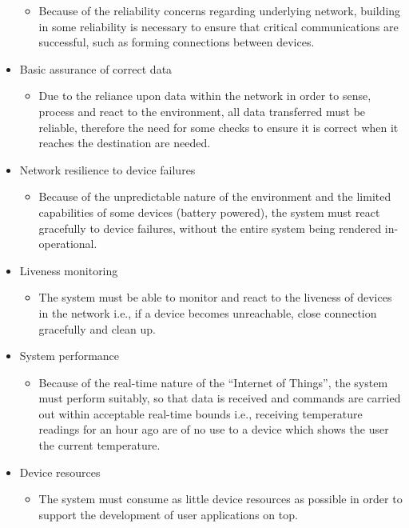 \begin{itemize}
	\begin{itemize}
		\item Because of the reliability concerns regarding underlying network, building in some reliability is necessary to ensure that critical communications are successful, such as forming connections between devices. 
	\end{itemize}
	\item Basic assurance of correct data
	\begin{itemize}
			\item Due to the reliance upon data within the network in order to sense, process and react to the environment, all data transferred must be reliable, therefore the need for some checks to ensure it is correct when it reaches the destination are needed. 
	\end{itemize}
	\item Network resilience to device failures
	\begin{itemize}
		\item Because of the unpredictable nature of the environment and the limited capabilities of some devices (battery powered), the system must react gracefully to device failures, without the entire system being rendered in-operational.
	\end{itemize}
	\item Liveness monitoring
	\begin{itemize}
		\item The system must be able to monitor and react to the liveness of devices in the network i.e., if a device becomes unreachable, close connection gracefully and clean up.
	\end{itemize}
	\item System performance
	\begin{itemize}
		\item Because of the real-time nature of the ``Internet of Things'', the system must perform suitably, so that data is received and commands are carried out within acceptable real-time bounds i.e., receiving temperature readings for an hour ago are of no use to a device which shows the user the current temperature.
	\end{itemize}
	\item Device resources
	\begin{itemize}
		\item The system must consume as little device resources as possible in order to support the development of user applications on top.
	\end{itemize}
\end{itemize}

